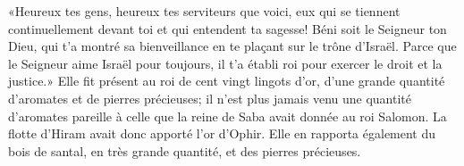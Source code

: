«Heureux tes gens, heureux tes serviteurs que voici,
	eux qui se tiennent continuellement devant toi et qui entendent ta sagesse!
Béni soit le Seigneur ton Dieu,
	qui t’a montré sa bienveillance en te plaçant sur le trône d’Israël.
Parce que le Seigneur aime Israël pour toujours,
	il t’a établi roi pour exercer le droit et la justice.»
Elle fit présent au roi de cent vingt lingots d’or,
	d’une grande quantité d’aromates et de pierres précieuses;
	il n’est plus jamais venu une quantité d’aromates
		pareille à celle que la reine de Saba avait donnée au roi Salomon.
La flotte d’Hiram avait donc apporté l’or d’Ophir.
	Elle en rapporta également du bois de santal, en très grande quantité,
	et des pierres précieuses.
